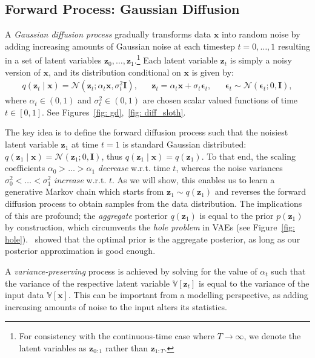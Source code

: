 \subsection{Forward Process: Gaussian Diffusion}
\label{subsec: Gaussian Diffusion Process: Forward Time}
%
A \textit{Gaussian diffusion process} gradually transforms data $\mathbf{x}$ into random noise by adding increasing amounts of Gaussian noise at each timestep $t=0,\dots,1$ resulting in a set of latent variables $\mathbf{z}_0,\dots,\mathbf{z}_1$.\footnote{For consistency with the continuous-time case where $T \to \infty$, we denote the latent variables as $\mathbf{z}_{0:1}$ rather than $\mathbf{z}_{1:T}$.}
Each latent variable $\mathbf{z}_t$ is simply a noisy version of $\mathbf{x}$, and its distribution conditional on $\mathbf{x}$ is given by:
%
\begin{align}
    && q(\mathbf{z}_t \mid \mathbf{x}) = \mathcal{N}\left(\mathbf{z}_t;\alpha_{t} \mathbf{x}, \sigma^2_{t} \mathbf{I}\right), && \mathbf{z}_t = \alpha_{t} \mathbf{x} + \sigma_{t}\boldsymbol{\epsilon}_t, && \boldsymbol{\epsilon}_t \sim \mathcal{N}\left(\boldsymbol{\epsilon}_t; 0, \mathbf{I}\right),&&
\end{align}
%
where $\alpha_{t} \in (0,1)$ and $\sigma^2_{t} \in (0,1)$ are chosen scalar valued functions of time $t \in [0,1]$. See Figures~\ref{fig: gd},~\ref{fig: diff_sloth}.

The key idea is to define the forward diffusion process such that the noisiest latent variable $\mathbf{z}_1$ at time $t=1$ is standard Gaussian distributed: $q(\mathbf{z}_1 \mid \mathbf{x}) = \mathcal{N}(\mathbf{z}_1; 0, \mathbf{I})$, thus $q(\mathbf{z}_1 \mid \mathbf{x}) = q(\mathbf{z}_1)$. To that end, the scaling coefficients $\alpha_{0} > \ldots > \alpha_{1}$ \textit{decrease} w.r.t. time $t$, whereas the noise variances $\sigma_{0}^2 < \ldots < \sigma_{1}^2$ \textit{increase} w.r.t. $t$. As we will show, this enables us to learn a generative Markov chain which starts from $\mathbf{z}_1 \sim q(\mathbf{z}_1)$ and reverses the forward diffusion process to obtain samples from the data distribution. The implications of this are profound; the \textit{aggregate} posterior $q(\mathbf{z}_1)$ is equal to the prior $p(\mathbf{z}_1)$ by construction, which circumvents the \textit{hole problem} in VAEs (see Figure~\ref{fig: hole}).~\cite{hoffman2016elbo} showed that the optimal prior is the aggregate posterior, as long as our posterior approximation is good enough.

A \textit{variance-preserving} process is achieved by solving for the value of $\alpha_t$ such that the variance of the respective latent variable $\mathbb{V}[\mathbf{z}_t]$ is equal to the variance of the input data $\mathbb{V}[\mathbf{x}]$. This can be important from a modelling perspective, as adding increasing amounts of noise to the input alters its statistics.

